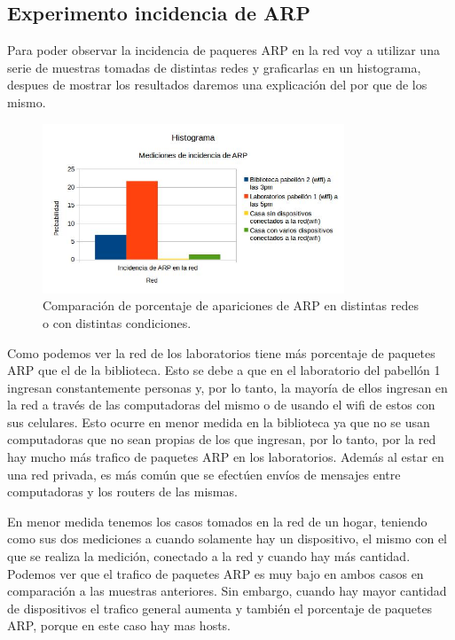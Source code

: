 \subsection{Experimento incidencia de ARP}

Para poder observar la incidencia de paqueres ARP en la red voy a utilizar una serie de muestras tomadas de distintas redes y graficarlas en un histograma, despues de mostrar
los resultados daremos una explicación del por que de los mismo.

\begin{figure}[ht!]
\centering
\includegraphics[width=90mm]{imagenes/IncidenciaARP.jpg}
\caption{Comparación de porcentaje de apariciones de ARP en distintas redes o con distintas condiciones.\label{overflow}}
\end{figure}

Como podemos ver la red de los laboratorios tiene más porcentaje de paquetes ARP que el de la biblioteca. Esto se debe a que en el laboratorio del pabellón 1 ingresan 
constantemente personas y, por lo tanto, la mayoría de ellos ingresan en la red a través de las computadoras del mismo o de usando el wifi de estos con sus celulares. Esto 
ocurre en menor medida en la biblioteca ya que no se usan computadoras que no sean propias de los que ingresan, por lo tanto, por la red hay mucho más trafico de paquetes 
ARP en los laboratorios. Además al estar en una red privada, es más común que se efectúen envíos de mensajes entre computadoras y los routers de las mismas.

En menor medida tenemos los casos tomados en la red de un hogar, teniendo como sus dos mediciones a cuando solamente hay un dispositivo, el mismo con el que se realiza la medición, 
conectado a la red y cuando hay más cantidad. Podemos ver que el trafico de paquetes ARP es muy bajo en ambos casos en comparación a las muestras anteriores. Sin embargo, 
cuando hay mayor cantidad de dispositivos el trafico general aumenta y también el porcentaje de paquetes ARP, porque en este caso hay mas hosts.

